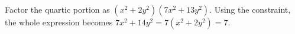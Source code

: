 Factor the quartic portion as $(x^2+2y^2)(7x^2+13y^2)$. Using the constraint, the whole expression becomes $7x^2+14y^2=7(x^2+2y^2)=\boxed7$.
